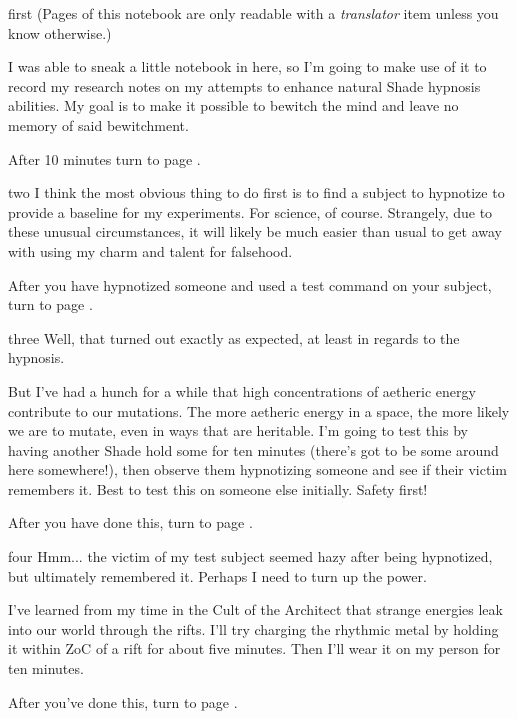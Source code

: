 \documentclass[notebook]{Silversiders} %
\begin{document}
\startnotebook{\nHypnosisResearch{}}

\begin{page}{first}
(Pages of this notebook are only readable with a \emph{translator} item unless you know otherwise.)

I was able to sneak a little notebook in here, so I'm going to make use of it to record my research notes on my attempts to enhance natural Shade hypnosis abilities. My goal is to make it possible to bewitch the mind and leave no memory of said bewitchment.

After 10 minutes turn to page .
\end{page}

\begin{page}{two}
I think the most obvious thing to do first is to find a subject to hypnotize to provide a baseline for my experiments. For science, of course. Strangely, due to these unusual circumstances, it will likely be much easier than usual to get away with using my charm and talent for falsehood.

After you have hypnotized someone and used a test command on your subject, turn to page .
\end{page}

\begin{page}{three}
Well, that turned out exactly as expected, at least in regards to the hypnosis.

But I've had a hunch for a while that high concentrations of aetheric energy contribute to our mutations. The more aetheric energy in a space, the more likely we are to mutate, even in ways that are heritable. I'm going to test this by having another Shade hold some \iAethericMetal{} for ten minutes (there's got to be some around here somewhere!), then observe them hypnotizing someone and see if their victim remembers it. Best to test this on someone else initially. Safety first!

After you have done this, turn to page .
\end{page}

\begin{page}{four}
Hmm... the victim of my test subject seemed hazy after being hypnotized, but ultimately remembered it. Perhaps I need to turn up the power. 

I've learned from my time in the Cult of the Architect that strange energies leak into our world through the rifts. I'll try charging the rhythmic metal by holding it within ZoC of a rift for about five minutes. Then I'll wear it on my person for ten minutes.

After you've done this, turn to page .
\end{page}
\end{document}
